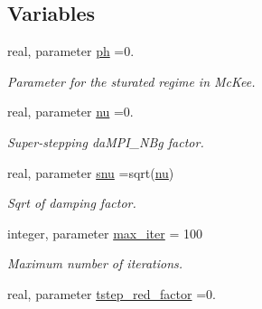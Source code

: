 \subsection*{Variables}
\begin{DoxyCompactItemize}
\item 
\hypertarget{namespacethermal__cond_a37c3e000231baaaa4668f7c05f021ce0}{}real, parameter \hyperlink{namespacethermal__cond_a37c3e000231baaaa4668f7c05f021ce0}{ph} =0.\label{namespacethermal__cond_a37c3e000231baaaa4668f7c05f021ce0}

\begin{DoxyCompactList}\small\item\em Parameter for the sturated regime in Mc\+Kee. \end{DoxyCompactList}\item 
\hypertarget{namespacethermal__cond_a38896e6bbd3b053ca066e407e4b3817f}{}real, parameter \hyperlink{namespacethermal__cond_a38896e6bbd3b053ca066e407e4b3817f}{nu} =0.\label{namespacethermal__cond_a38896e6bbd3b053ca066e407e4b3817f}

\begin{DoxyCompactList}\small\item\em Super-\/stepping da\+M\+P\+I\+\_\+\+N\+Bg factor. \end{DoxyCompactList}\item 
\hypertarget{namespacethermal__cond_a53b14d15ce11990f6453a335c81d1728}{}real, parameter \hyperlink{namespacethermal__cond_a53b14d15ce11990f6453a335c81d1728}{snu} =sqrt(\hyperlink{namespacethermal__cond_a38896e6bbd3b053ca066e407e4b3817f}{nu})\label{namespacethermal__cond_a53b14d15ce11990f6453a335c81d1728}

\begin{DoxyCompactList}\small\item\em Sqrt of damping factor. \end{DoxyCompactList}\item 
\hypertarget{namespacethermal__cond_a5420f28be46174eb6852f14281ec7ace}{}integer, parameter \hyperlink{namespacethermal__cond_a5420f28be46174eb6852f14281ec7ace}{max\+\_\+iter} = 100\label{namespacethermal__cond_a5420f28be46174eb6852f14281ec7ace}

\begin{DoxyCompactList}\small\item\em Maximum number of iterations. \end{DoxyCompactList}\item 
\hypertarget{namespacethermal__cond_ae13a8d994e65b9e57ebb80e892c72aac}{}real, parameter \hyperlink{namespacethermal__cond_ae13a8d994e65b9e57ebb80e892c72aac}{tstep\+\_\+red\+\_\+factor} =0.\label{namespacethermal__cond_ae13a8d994e65b9e57ebb80e892c72aac}


\end{DoxyCompactItemize}

